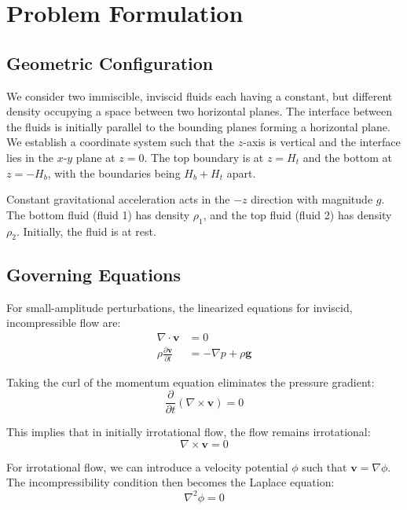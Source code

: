 \documentclass[12pt,a4paper]{article}
\begin{document}
\section{Problem Formulation}
\subsection{Geometric Configuration}
We consider two immiscible, inviscid fluids each having a constant, but different density occupying a space between two horizontal planes. The interface between the fluids is initially parallel to the bounding planes forming a horizontal plane. We establish a coordinate system such that the $z$-axis is vertical and the interface lies in the $x$-$y$ plane at $z = 0$. The top boundary is at $z = H_t$ and the bottom at $z = -H_b$, with the boundaries being $H_b + H_t$ apart.

Constant gravitational acceleration acts in the $-z$ direction with magnitude $g$. The bottom fluid (fluid 1) has density $\rho_1$, and the top fluid (fluid 2) has density $\rho_2$. Initially, the fluid is at rest.

\subsection{Governing Equations}
For small-amplitude perturbations, the linearized equations for inviscid, incompressible flow are:
\begin{align}
\nabla \cdot \mathbf{v} &= 0 \\
\rho \frac{\partial \mathbf{v}}{\partial t} &= -\nabla p + \rho \mathbf{g}
\end{align}

Taking the curl of the momentum equation eliminates the pressure gradient:
\begin{equation}
\frac{\partial}{\partial t}(\nabla \times \mathbf{v}) = 0
\end{equation}

This implies that in initially irrotational flow, the flow remains irrotational:
\begin{equation}
\nabla \times \mathbf{v} = 0
\end{equation}

For irrotational flow, we can introduce a velocity potential $\phi$ such that $\mathbf{v} = \nabla \phi$. The incompressibility condition then becomes the Laplace equation:
\begin{equation}
\nabla^2 \phi = 0
\end{equation}
\end{document}
